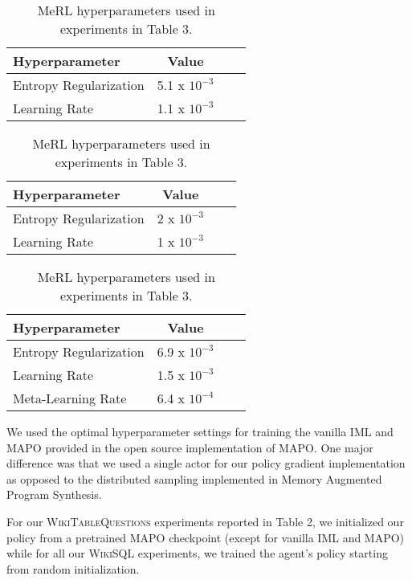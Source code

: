 \begin{table}[tb]
	\footnotesize
	\caption{MAPOX hyperparameters used for experiments in Table 3.}
	\label{wikisql_hparam:1}
	\begin{center}
	\begin{tabular}{@{\ww}lccr@{\ww}}
	\toprule
	Hyperparameter & Value \\
	\midrule
	Entropy Regularization & 5.1 x $10^{-3}$ \\
	Learning Rate & 1.1 x $10^{-3}$ \\
	\bottomrule
	\end{tabular}
	\end{center}

	\caption{BoRL hyperparameters used in experiments in Table 3.}
	\label{wikisql_hparam:2}
	\begin{center}
	\begin{tabular}{@{\ww}lccr@{\ww}}
	\toprule
	Hyperparameter & Value \\
	\midrule
	Entropy Regularization & 2 x $10^{-3}$ \\
	Learning Rate & 1 x $10^{-3}$ \\
	\bottomrule
	\end{tabular}
	\end{center}

	\caption{MeRL hyperparameters used in experiments in Table 3.}
	\label{wikisql_hparam:3}
	\begin{center}
	\begin{tabular}{@{\ww}lccr@{\ww}}
	\toprule
	Hyperparameter & Value \\
	\midrule
	Entropy Regularization & 6.9 x $10^{-3}$ \\
	Learning Rate & 1.5 x $10^{-3}$ \\
	Meta-Learning Rate & 6.4 x $10^{-4}$ \\
	\bottomrule
	\end{tabular}
	\end{center}
\end{table}

We used the optimal hyperparameter settings for training the vanilla IML and MAPO
provided in the open source implementation of MAPO.  One
major difference was that we used a single actor for our policy gradient implementation
as opposed to the distributed sampling implemented in Memory Augmented Program Synthesis.

For our \textsc{WikiTableQuestions} experiments reported in Table 2,
we initialized our policy from a pretrained MAPO
checkpoint (except for vanilla IML and MAPO) while for all
our \textsc{WikiSQL} experiments, we trained the agent's policy
starting from random initialization.

